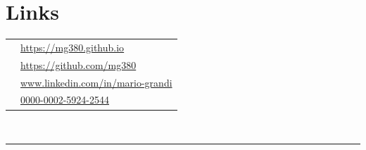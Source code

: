 \documentclass[oneside]{article}
\begin{document}
{\begin{minipage}[t][\textheight-2\fboxsep-2\fboxrule][t]{\dimexpr0.4\textwidth-2\fboxrule-2\fboxsep\relax}
        \section*{\large Links}
        \begin{tabular}{cl}
            \faGlobe{}     & \href{https://mg380.github.io}{https://mg380.github.io}\\
            \faGithub{}   & \href{https://github.com/mg380}{https://github.com/mg380} \\
            \faLinkedin{} & \href{https://www.linkedin.com/in/mario-grandi/}{www.linkedin.com/in/mario-grandi} \\
            \aiOrcid{}     & \href{https://orcid.org/0000-0002-5924-2544}{0000-0002-5924-2544} \\
        \end{tabular}
        \vspace{10pt} \\
        \rule{\linewidth}{0.4pt} \\

\end{minipage}}
\end{document}
